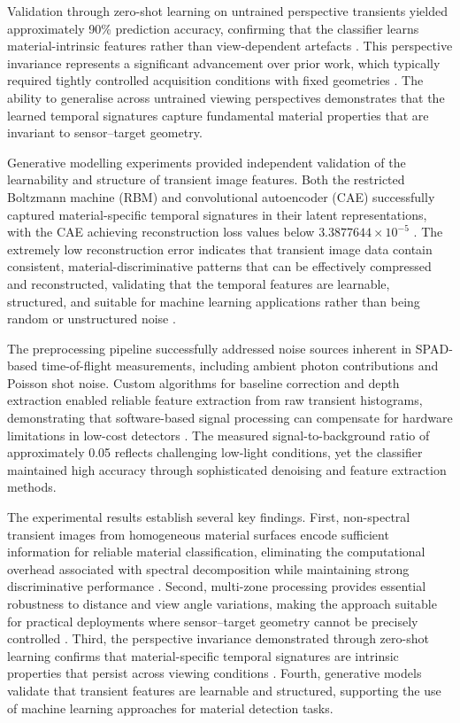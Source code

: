 \documentclass[12pt,a4paper,oneside]{report}
\begin{document}
Validation through zero-shot learning on untrained perspective transients yielded approximately 90\% prediction accuracy, confirming that the classifier learns material-intrinsic features rather than view-dependent artefacts \cite{jungerman2022}. This perspective invariance represents a significant advancement over prior work, which typically required tightly controlled acquisition conditions with fixed geometries \cite{becker2023}. The ability to generalise across untrained viewing perspectives demonstrates that the learned temporal signatures capture fundamental material properties that are invariant to sensor--target geometry.

Generative modelling experiments provided independent validation of the learnability and structure of transient image features. Both the restricted Boltzmann machine (RBM) and convolutional autoencoder (CAE) successfully captured material-specific temporal signatures in their latent representations, with the CAE achieving reconstruction loss values below $3.3877644 \times 10^{-5}$ \cite{ackley1985,su2016}. The extremely low reconstruction error indicates that transient image data contain consistent, material-discriminative patterns that can be effectively compressed and reconstructed, validating that the temporal features are learnable, structured, and suitable for machine learning applications rather than being random or unstructured noise \cite{jungerman2022,becker2023}.

The preprocessing pipeline successfully addressed noise sources inherent in SPAD-based time-of-flight measurements, including ambient photon contributions and Poisson shot noise. Custom algorithms for baseline correction and depth extraction enabled reliable feature extraction from raw transient histograms, demonstrating that software-based signal processing can compensate for hardware limitations in low-cost detectors \cite{tontini2024}. The measured signal-to-background ratio of approximately 0.05 reflects challenging low-light conditions, yet the classifier maintained high accuracy through sophisticated denoising and feature extraction methods.

The experimental results establish several key findings. First, non-spectral transient images from homogeneous material surfaces encode sufficient information for reliable material classification, eliminating the computational overhead associated with spectral decomposition while maintaining strong discriminative performance \cite{su2016,becker2023}. Second, multi-zone processing provides essential robustness to distance and view angle variations, making the approach suitable for practical deployments where sensor--target geometry cannot be precisely controlled \cite{fasolino2024}. Third, the perspective invariance demonstrated through zero-shot learning confirms that material-specific temporal signatures are intrinsic properties that persist across viewing conditions \cite{jungerman2022}. Fourth, generative models validate that transient features are learnable and structured, supporting the use of machine learning approaches for material detection tasks.
\end{document}
